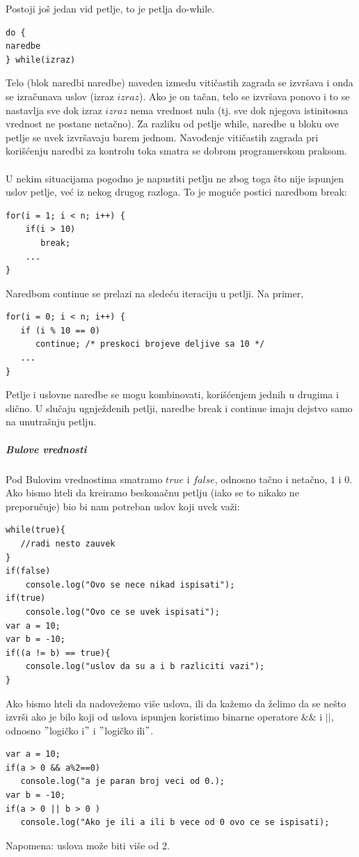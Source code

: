 \documentclass[a4paper]{article}
\begin{document}
Postoji još jedan vid petlje, to je petlja do-while.
\begin{verbatim}
do {
naredbe
} while(izraz)
\end{verbatim}
Telo (blok naredbi naredbe) naveden izmedu vitičastih
zagrada se izvršava i onda se izračunava uslov (izraz $izraz$).
Ako je on tačan, telo se izvršava ponovo i to se nastavlja sve
dok izraz $izraz$ nema vrednost nula (tj. sve dok njegova
istinitosna vrednost ne postane netačno).
Za razliku od petlje while, naredbe u bloku ove petlje se uvek
izvršavaju barem jednom. Navođenje vitičastih zagrada pri korišćenju naredbi za kontrolu toka smatra se dobrom programerskom praksom.\\\\

U nekim situacijama pogodno je napustiti petlju ne zbog toga
što nije ispunjen uslov petlje, već iz nekog drugog razloga. To
je moguće postici naredbom break:
\begin{verbatim}
for(i = 1; i < n; i++) {
    if(i > 10)
       break;
    ...
}
\end{verbatim}
Naredbom continue se prelazi na sledeću iteraciju u petlji.
Na primer,
\begin{verbatim}
for(i = 0; i < n; i++) {
   if (i % 10 == 0)
      continue; /* preskoci brojeve deljive sa 10 */
   ...
}
\end{verbatim}
Petlje i uslovne naredbe se mogu kombinovati, korišćenjem jednih u drugima i slično.
U slučaju ugnježdenih petlji, naredbe break i continue imaju
dejstvo samo na unutrašnju petlju.
\subparagraph{Bulove vrednosti}
Pod Bulovim vrednostima smatramo $true$ i $false$, odnosno tačno i netačno, $1$ i $0$. 
Ako bismo hteli da kreiramo beskonačnu petlju (iako se to nikako ne preporučuje) bio bi nam potreban uslov koji uvek važi:
\begin{verbatim}
while(true){
   //radi nesto zauvek
}
if(false)
    console.log("Ovo se nece nikad ispisati");
if(true)
    console.log("Ovo ce se uvek ispisati");
var a = 10;
var b = -10;
if((a != b) == true){
    console.log("uslov da su a i b razliciti vazi");
}
\end{verbatim}
Ako bismo hteli da nadovežemo više uslova, ili da kažemo da želimo da se nešto izvrši ako je bilo koji od uslova ispunjen koristimo binarne operatore $\&\&$ i $||$, odnosno $"$logičko i$"$ i $"$logičko ili$"$.
\begin{verbatim}
var a = 10;
if(a > 0 && a%2==0)
   console.log("a je paran broj veci od 0.);
var b = -10;
if(a > 0 || b > 0 )
   console.log("Ako je ili a ili b vece od 0 ovo ce se ispisati);
\end{verbatim}
Napomena: uslova može biti više od 2.
\end{document}

